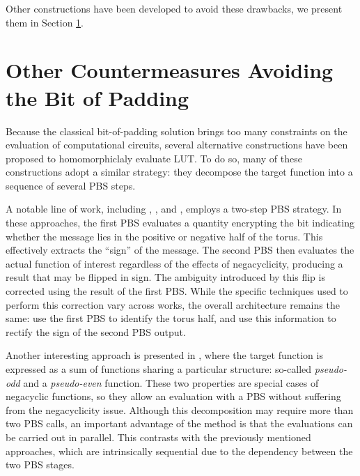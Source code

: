 Other constructions have been developed to avoid these drawbacks, we present them in Section \ref{sec:soa_padding_bit}.



\section{Other Countermeasures Avoiding the Bit of Padding}
\label{sec:soa_padding_bit}

Because the classical bit-of-padding solution brings too many constraints on the evaluation of computational circuits, several alternative constructions have been proposed to homomorphiclaly evaluate \gls{LUT}. To do so, many of these constructions adopt a similar strategy: they decompose the target function into a sequence of several \gls{PBS} steps. 

A notable line of work, including \cite{EPRINT:YXSCZ21}, \cite{AC:LiuMicPol22}, and \cite{TCHES:KluSch23}, employs a two-step \gls{PBS} strategy. In these approaches, the first \gls{PBS} evaluates a quantity  encrypting the bit indicating whether the message lies in the positive or negative half of the torus. This effectively extracts the ``sign'' of the message. The second \gls{PBS} then evaluates the actual function of interest regardless of the effects of negacyclicity, producing a result that may be flipped in sign. The ambiguity introduced by this flip is corrected using the result of the first \gls{PBS}. While the specific techniques used to perform this correction vary across works, the overall architecture remains the same: use the first \gls{PBS} to identify the torus half, and use this information to rectify the sign of the second \gls{PBS} output.

Another interesting approach is presented in \cite{AFRICACRYPT:CBSZ23}, where the target function is expressed as a sum of functions sharing a particular structure: so-called \textit{pseudo-odd} and a \textit{pseudo-even} function. These two properties are special cases of negacyclic functions, so they allow an evaluation with a \gls{PBS} without suffering from the negacyclicity issue. Although this decomposition may require more than two \gls{PBS} calls, an important advantage of the method is that the evaluations can be carried out in parallel. This contrasts with the previously mentioned approaches, which are intrinsically sequential due to the dependency between the two \gls{PBS} stages.

